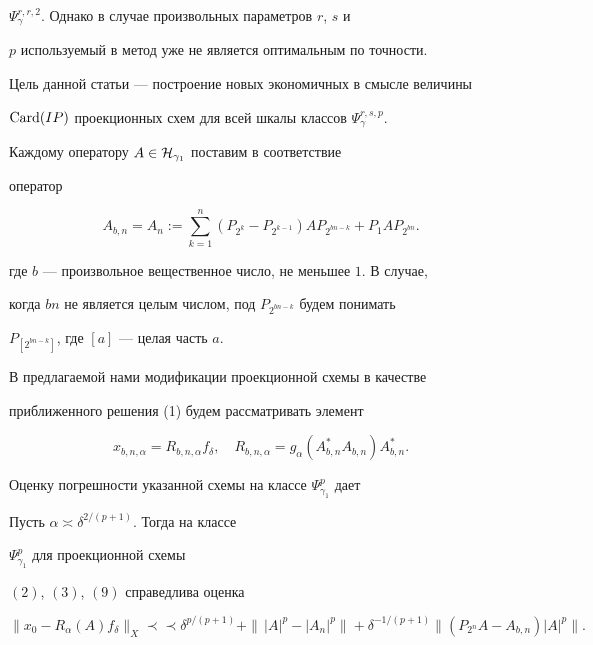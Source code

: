 $\Psi_\gamma^{r,r,2}$. Однако в случае произвольных параметров $r$, $s$ и


$p$ используемый в \cite{P} метод уже не является оптимальным по точности.


Цель данной статьи --- построение новых экономичных в смысле величины


$\operatorname{Card}(IP)$ проекционных схем для всей шкалы классов $\Psi_\gamma^{r,s,p}$.





Каждому оператору $A\in {\cal H}_{\gamma_1}$ поставим в соответствие


оператор


$$


A_{b,n} = A_n := \sum_{k=1}^n


(P_{2^k} - P_{2^{k-1}})AP_{2^{bn-k}} + P_1AP_{2^{bn}}.


$$


где $b$ --- произвольное вещественное число, не меньшее $1$. В случае,


когда $bn$ не является целым числом, под $P_{2^{bn-k}}$ будем понимать


$P_{[2^{bn-k}]}$, где $[a]$ --- целая часть $a$.


В предлагаемой нами модификации проекционной схемы в качестве


приближенного решения (1) будем рассматривать элемент


\begin{equation}


x_{b,n,\alpha} = R_{b,n,\alpha}f_\delta , \quad


R_{b,n,\alpha} = g_\alpha(A_{b,n}^*A_{b,n})A_{b,n}^* .


\end{equation}





Оценку погрешности указанной схемы на классе $\Psi_{\gamma_1}^p$ дает





\begin{thm} Пусть $\alpha\asymp\delta^{2/(p+1)}$. Тогда на классе


$\Psi_{\gamma_1}^p$ для проекционной схемы


$(2)$, $(3)$, $(9)$ справедлива оценка


$$


\|x_0 -R_\alpha(A)f_\delta\|_X \prec\prec


\delta^{p/(p+1)} + \|\,|A|^p -|A_n|^p\| +


\delta^{-1/(p+1)}\|(P_{2^n}A-A_{b,n})|A|^p\| .


$$


\end{thm}





